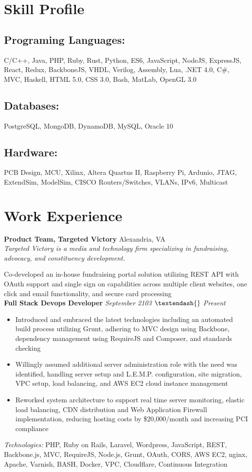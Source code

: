 \documentclass[10pt]{article}
\begin{document}
\section*{Skill Profile}
\subsection*{Programing Languages:}
C/C++, Java, PHP, Ruby, Rust, Python, ES6, JavaScript, NodeJS, ExpressJS, React, Redux, BackboneJS, VHDL, Verilog, Assembly, Lua, .NET 4.0, C\#, MVC, Haskell, HTML 5.0, CSS 3.0, Bash, MatLab, OpenGL 3.0
\subsection*{Databases:}
PostgreSQL, MongoDB, DynamoDB, MySQL, Oracle 10
\subsection*{Hardware:}
PCB Design, MCU, Xilinx, Altera Quartus II, Raspberry Pi, Ardunio, JTAG, ExtendSim, ModelSim, CISCO Routers/Switches, VLANs, IPv6, Multicast

\section*{Work Experience}
\textbf{Product Team, Targeted Victory} \hfill Alexandria, VA \\
\textit{Targeted Victory is a media and technology firm specializing in fundraising, advocacy, and constituency development.} \\
\begin{addmargin}[1em]{0em}
  Co-developed an in-house fundraising portal solution utilizing REST API with OAuth support and single sign on capabilities across multiple client websites, one click and email functionality, and secure card processing \\
  \textbf{Full Stack Devops Developer} \hfill \textit{September 2103 $\textendash{}$ Present}
\end{addmargin}
\begin{itemize}
  \item Introduced and embraced the latest technologies including an automated build process utilizing Grunt, adhering to MVC design using Backbone, dependency management using RequireJS and Composer, and standards checking
  \item Willingly assumed additional server administration role with the need was identified, handling server setup and L.E.M.P. configuration, site migration, VPC setup, load balancing, and AWS EC2 cloud instance management
  \item Reworked system architecture to support real time server monitoring, elastic load balancing, CDN distribution and Web Application Firewall implementation, reducing hosting costs by \$20,000/month and increasing PCI compliance
\end{itemize}
\textit{Technologies:} PHP, Ruby on Rails, Laravel, Wordpress, JavaScript, REST, Backbone.js, MVC, RequireJS, Node.js, Grunt, OAuth, CORS, AWS EC2, nginx, Apache, Varnish, BASH, Docker, VPC, Cloudflare, Continuous Integration
\end{document}
